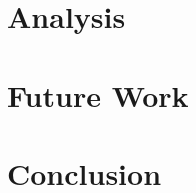 \documentclass[conference]{IEEEtran}
\begin{document}
\section{Analysis}

\section{Future Work}

\section{Conclusion}

\printbibliography
\end{document}
